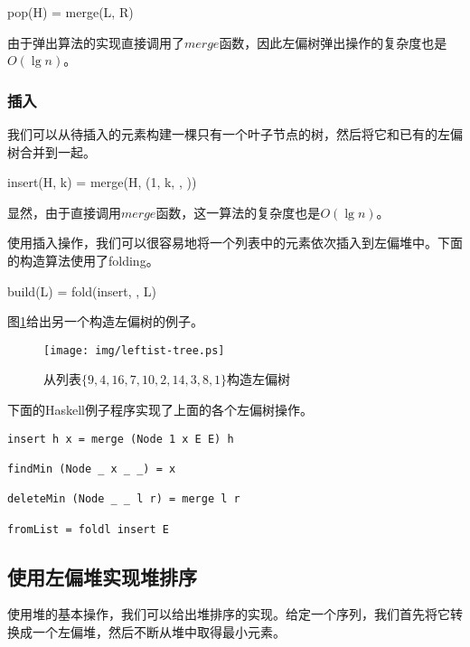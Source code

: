 \documentclass[UTF8]{article}
\begin{document}
\be
pop(H) = merge(L, R)
\ee

由于弹出算法的实现直接调用了$merge$函数，因此左偏树弹出操作的复杂度也是$O(\lg n)$。

\subsubsection{插入}

我们可以从待插入的元素构建一棵只有一个叶子节点的树，然后将它和已有的左偏树合并到一起。

\be
insert(H, k) = merge(H, (1, k, \phi, \phi))
\ee

显然，由于直接调用$merge$函数，这一算法的复杂度也是$O(\lg n)$。

使用插入操作，我们可以很容易地将一个列表中的元素依次插入到左偏堆中。下面的构造算法使用了folding。

\be
build(L) = fold(insert, \phi, L)
\ee

图\ref{fig:leftist-tree}给出另一个构造左偏树的例子。

\begin{figure}[htbp]
   \begin{center}
   	  \texttt{[image: img/leftist-tree.ps]}
    \caption{从列表$\{9, 4, 16, 7, 10, 2, 14, 3, 8, 1\}$构造左偏树}
    \label{fig:leftist-tree}
   \end{center}
\end{figure}

下面的Haskell例子程序实现了上面的各个左偏树操作。

\lstset{language=Haskell}
\begin{lstlisting}[style=Haskell]
insert h x = merge (Node 1 x E E) h

findMin (Node _ x _ _) = x

deleteMin (Node _ _ l r) = merge l r

fromList = foldl insert E
\end{lstlisting}

\subsection{使用左偏堆实现堆排序}

使用堆的基本操作，我们可以给出堆排序的实现。给定一个序列，我们首先将它转换成一个左偏堆，然后不断从堆中取得最小元素。
\end{document}
